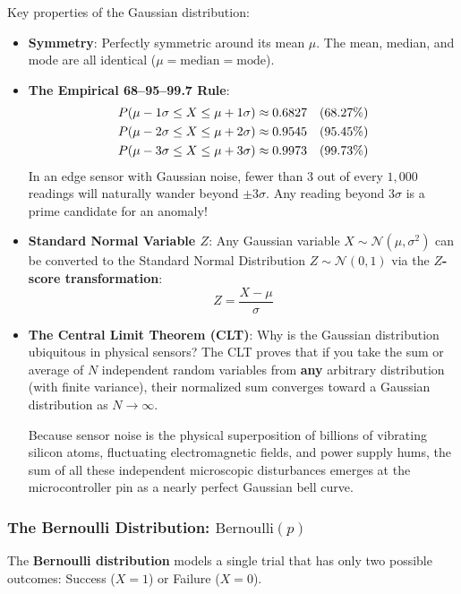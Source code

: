 Key properties of the Gaussian distribution:
\begin{itemize}
    \item \textbf{Symmetry}: Perfectly symmetric around its mean $\mu$. The mean, median, and mode are all identical ($\mu = \text{median} = \text{mode}$).
    \item \textbf{The Empirical 68--95--99.7 Rule}:
    \begin{align}
    P(\mu - 1\sigma \le X \le \mu + 1\sigma) &\approx 0.6827 \quad (68.27\%) \notag\\
    P(\mu - 2\sigma \le X \le \mu + 2\sigma) &\approx 0.9545 \quad (95.45\%) \notag\\
    P(\mu - 3\sigma \le X \le \mu + 3\sigma) &\approx 0.9973 \quad (99.73\%) \label{eq:68_95_99_rule}
    \end{align}
    In an edge sensor with Gaussian noise, fewer than $3$ out of every $1,000$ readings will naturally wander beyond $\pm 3\sigma$. Any reading beyond $3\sigma$ is a prime candidate for an anomaly!
    \item \textbf{Standard Normal Variable $Z$}: Any Gaussian variable $X \sim \mathcal{N}(\mu, \sigma^2)$ can be converted to the Standard Normal Distribution $Z \sim \mathcal{N}(0, 1)$ via the \textbf{$Z$-score transformation}:
    \begin{equation}
    Z = \frac{X - \mu}{\sigma}\label{eq:z_score}
    \end{equation}
    \item \textbf{The Central Limit Theorem (CLT)}: Why is the Gaussian distribution ubiquitous in physical sensors? The CLT proves that if you take the sum or average of $N$ independent random variables from \textbf{any} arbitrary distribution (with finite variance), their normalized sum converges toward a Gaussian distribution as $N \to \infty$. 

    Because sensor noise is the physical superposition of billions of vibrating silicon atoms, fluctuating electromagnetic fields, and power supply hums, the sum of all these independent microscopic disturbances emerges at the microcontroller pin as a nearly perfect Gaussian bell curve.
\end{itemize}

\subsubsection{The Bernoulli Distribution: $\text{Bernoulli}(p)$}
The \textbf{Bernoulli distribution} models a single trial that has only two possible outcomes: Success ($X = 1$) or Failure ($X = 0$).


